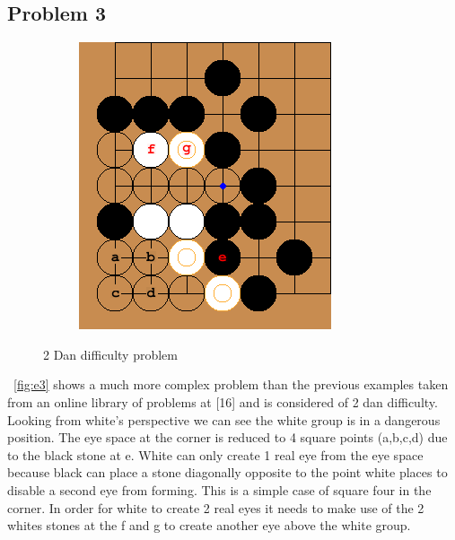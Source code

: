 \documentclass{l4proj}
\begin{document}
\subsection{Problem 3}

\begin{figure}[!ht]
\centering
\begin{subfigure}[b]{0.45\textwidth}
\includegraphics[width=\textwidth]{ep3/1.png}
\end{subfigure}
\caption{2 Dan difficulty problem}
\label{fig:ep3}
\end{figure}

~\autoref{fig:e3} shows a much more complex problem than the previous examples taken from an online library of problems at [16] and is considered of 2 dan difficulty. Looking from white’s perspective we can see the white group is in a dangerous position. The eye space at the corner is reduced to 4 square points (a,b,c,d) due to the black stone at e. White can only create 1 real eye from the eye space because black can place a stone diagonally opposite to the point white places to disable a second eye from forming. This is a simple case of square four in the corner. In order for white to create 2 real eyes it needs to make use of the 2 whites stones at the f and g to create another eye above the white group.
\end{document}
